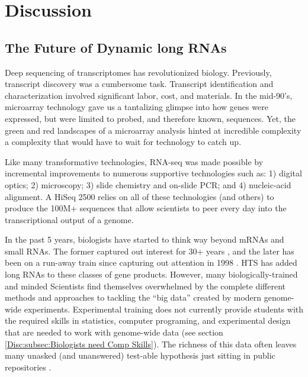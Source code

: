 \chapter{Discussion} \label{Disc}
\section{The Future of Dynamic long RNAs}
  \label{Disc:sec:Future of Dynamic long RNAs}

  Deep sequencing of transcriptomes has revolutionized biology. Previously, transcript discovery was a cumbersome task. Transcript identification and characterization involved significant labor, cost, and materials. In the mid-90's, microarray technology \citep{Schena1995a} gave us a tantalizing glimpse into how genes were expressed, but were limited to probed, and therefore known, sequences. Yet, the green and red landscapes of a microarray analysis hinted at incredible complexity \textemdash a complexity that would have to wait for technology to catch up.

  Like many transformative technologies, RNA-seq was made possible by incremental improvements to numerous supportive technologies such as: 1) digital optics; 2) microscopy; 3) slide chemistry and on-slide PCR; and 4) nucleic-acid alignment. A HiSeq 2500 relies on all of these technologies (and others) to produce the 100M+ sequences that allow scientists to peer every day into the transcriptional output of a genome.

  In the past 5 years, biologists have started to think way beyond mRNAs and small RNAs. The former captured out interest for 30+ years \citep{Furuichi1975,Wei1975}, and the later has been on a run-away train since capturing out attention in 1998 \citep{Fire1998}. HTS has added long RNAs to these classes of gene products. However, many biologically-trained and minded Scientists find themselves overwhelmed by the complete different methods and approaches to tackling the ``big data'' created by modern genome-wide experiments. Experimental training does not currently provide students with the required skills in statistics, computer programing, and experimental design that are needed to work with genome-wide data (see section \ref{Disc:subsec:Biologists need Comp Skills}). The richness of this data often leaves many unasked (and unanswered) test-able hypothesis just sitting in public repositories \citep{Plocik2013}.


